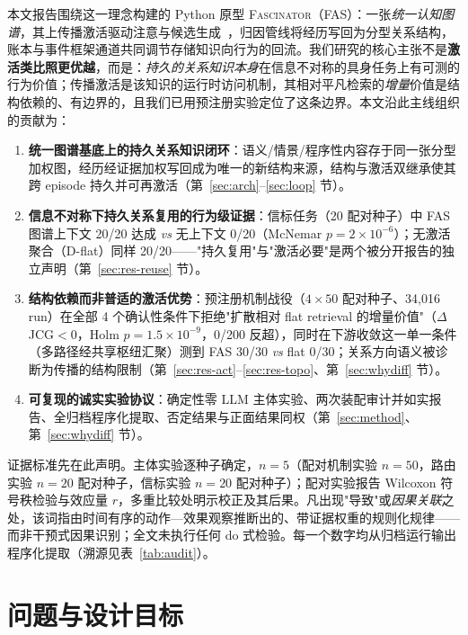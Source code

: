 \documentclass[10pt,a4paper]{ctexart}
\begin{document}
本文报告围绕这一理念构建的 Python 原型 \textsc{Fascinator}（FAS）：一张\emph{统一认知图谱}，其上传播激活驱动注意与候选生成~\citep{collins1975spreading}，归因管线将经历写回为分型关系结构，账本与事件框架通道共同调节存储知识向行为的回流。我们研究的核心主张不是\textbf{激活类比照更优越}，而是：\emph{持久的关系知识本身}在信息不对称的具身任务上有可测的行为价值；传播激活是该知识的运行时访问机制，其相对平凡检索的\emph{增量}价值是结构依赖的、有边界的，且我们已用预注册实验定位了这条边界。本文沿此主线组织的贡献为：

\begin{enumerate}
\item \textbf{统一图谱基底上的持久关系知识闭环}：语义/情景/程序性内容存于同一张分型加权图，经历经证据加权写回成为唯一的新结构来源，结构与激活双继承使其跨 episode 持久并可再激活（第~\ref{sec:arch}--\ref{sec:loop} 节）。
\item \textbf{信息不对称下持久关系复用的行为级证据}：信标任务（20 配对种子）中 FAS 图谱上下文 20/20 达成 \emph{vs} 无上下文 0/20（McNemar $p{=}2\times10^{-6}$）；无激活聚合（D-flat）同样 20/20——"持久复用"与"激活必要"是两个被分开报告的独立声明（第~\ref{sec:res-reuse} 节）。
\item \textbf{结构依赖而非普适的激活优势}：预注册机制战役（$4\times50$ 配对种子、34{,}016 run）在全部 4 个确认性条件下拒绝"扩散相对 flat retrieval 的增量价值"（$\Delta$JCG${<}0$，Holm $p{=}1.5\times10^{-9}$，0/200 反超），同时在下游收敛这一单一条件（多路径经共享枢纽汇聚）测到 FAS 30/30 \emph{vs} flat 0/30；关系方向语义被诊断为传播的结构限制（第~\ref{sec:res-act}--\ref{sec:res-topo}、第~\ref{sec:whydiff} 节）。
\item \textbf{可复现的诚实实验协议}：确定性零 LLM 主体实验、两次装配审计并如实报告、全归档程序化提取、否定结果与正面结果同权（第~\ref{sec:method}、第~\ref{sec:whydiff} 节）。
\end{enumerate}

证据标准先在此声明。主体实验逐种子确定，$n{=}5$（配对机制实验 $n{=}50$，路由实验 $n{=}20$ 配对种子，信标实验 $n{=}20$ 配对种子）；配对实验报告 Wilcoxon 符号秩检验与效应量 $r$，多重比较处明示校正及其后果。凡出现"导致"或\emph{因果关联}之处，该词指由时间有序的动作—效果观察推断出的、带证据权重的规则化规律——而非干预式因果识别；全文未执行任何 do 式检验。每一个数字均从归档运行输出程序化提取（溯源见表~\ref{tab:audit}）。

\section{问题与设计目标}
\label{sec:problem}
\end{document}

